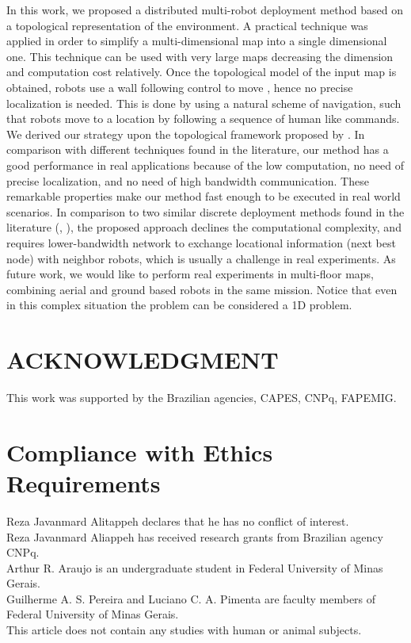 \documentclass[smallcondensed]{svjour3}
\begin{document}
In this work, we proposed a distributed multi-robot deployment method based on a topological representation of the environment. A practical technique was applied in order to simplify a multi-dimensional map into a single dimensional one. This technique can be used with very large maps decreasing the dimension and computation cost relatively.
%
Once the topological model of the input map is obtained, robots use a wall following control to move , hence no precise localization is needed. This is done by using a natural scheme of navigation, such that robots move to a location by following a sequence of human like commands. 
%
We derived our strategy upon the topological framework proposed by \cite{Arthur2015}. In comparison with different techniques found in the literature, our method has a good performance in real applications because of the low computation, no need of precise localization, and no need of high bandwidth communication. These remarkable properties make our method fast enough to be executed in real world scenarios. 
%
In comparison to two similar discrete deployment methods found in the literature (\cite{Yun2013}, \cite{Durham2012}), the proposed approach declines the computational complexity, and requires lower-bandwidth network to exchange locational information (next best node) with neighbor robots, which is usually a challenge in real experiments.
%
As future work, we would like to perform real experiments in multi-floor maps, combining aerial and ground based robots in the same mission. Notice that even in this complex situation the problem can be considered a 1D problem.


\section*{ACKNOWLEDGMENT}

This work was supported by the Brazilian agencies, CAPES, CNPq, FAPEMIG.

\section*{Compliance with Ethics Requirements}

Reza Javanmard Alitappeh declares that he has no conflict of interest.\\
Reza Javanmard Aliappeh has received research grants from Brazilian agency CNPq.\\
Arthur R. Araujo is an undergraduate student in Federal University of Minas Gerais.\\
Guilherme A. S. Pereira  and Luciano C. A. Pimenta are faculty members of Federal University of Minas Gerais.\\
This article does not contain any studies with human or animal subjects.


 
\end{document}
